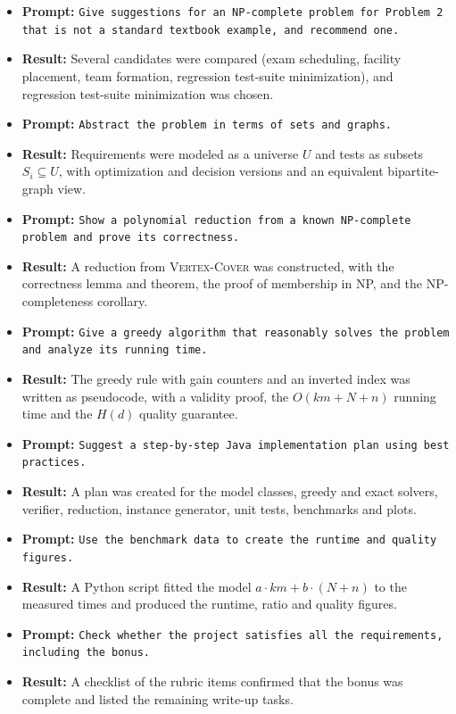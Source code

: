 \documentclass[conference]{IEEEtran}
\theoremstyle{definition}
\theoremstyle{remark}
\newcommand{\VC}{\textsc{Vertex-Cover}}
\begin{document}
\begin{itemize}
    \item \textbf{Prompt:} \texttt{Give suggestions for an NP-complete problem for Problem 2 that is not a standard textbook example, and recommend one.}
    \item \textbf{Result:} Several candidates were compared (exam scheduling, facility placement, team formation, regression test-suite minimization), and regression test-suite minimization was chosen.

    \item \textbf{Prompt:} \texttt{Abstract the problem in terms of sets and graphs.}
    \item \textbf{Result:} Requirements were modeled as a universe $U$ and tests as subsets $S_i \subseteq U$, with optimization and decision versions and an equivalent bipartite-graph view.

    \item \textbf{Prompt:} \texttt{Show a polynomial reduction from a known NP-complete problem and prove its correctness.}
    \item \textbf{Result:} A reduction from \VC{} was constructed, with the correctness lemma and theorem, the proof of membership in NP, and the NP-completeness corollary.

    \item \textbf{Prompt:} \texttt{Give a greedy algorithm that reasonably solves the problem and analyze its running time.}
    \item \textbf{Result:} The greedy rule with gain counters and an inverted index was written as pseudocode, with a validity proof, the $O(km+N+n)$ running time and the $H(d)$ quality guarantee.

    \item \textbf{Prompt:} \texttt{Suggest a step-by-step Java implementation plan using best practices.}
    \item \textbf{Result:} A plan was created for the model classes, greedy and exact solvers, verifier, reduction, instance generator, unit tests, benchmarks and plots.

    \item \textbf{Prompt:} \texttt{Use the benchmark data to create the runtime and quality figures.}
    \item \textbf{Result:} A Python script fitted the model $a\cdot km + b\cdot(N+n)$ to the measured times and produced the runtime, ratio and quality figures.

    \item \textbf{Prompt:} \texttt{Check whether the project satisfies all the requirements, including the bonus.}
    \item \textbf{Result:} A checklist of the rubric items confirmed that the bonus was complete and listed the remaining write-up tasks.


\end{itemize}
\end{document}
